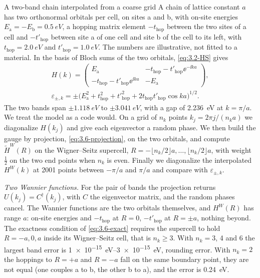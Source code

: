 \begin{workedexample}{A two-band chain interpolated from a coarse grid}\label{we:3-w1d}
A chain of lattice constant $a$ has two orthonormal orbitals per cell, on sites a and b, with on-site energies $E_{\mathrm{a}} = -E_{\mathrm{b}} = \SI{0.5}{eV}$, a hopping matrix element $-t_{\mathrm{hop}}$ between the two sites of a cell and $-t'_{\mathrm{hop}}$ between site a of one cell and site b of the cell to its left, with $t_{\mathrm{hop}} = \SI{2.0}{eV}$ and $t'_{\mathrm{hop}} = \SI{1.0}{eV}$. The numbers are illustrative, not fitted to a material. In the basis of Bloch sums of the two orbitals, \cref{eq:3.2-HS} gives
\begin{gather*}
  H(k) = \begin{pmatrix} E_{\mathrm{a}} & -t_{\mathrm{hop}} - t'_{\mathrm{hop}}\ee^{-\ii ka} \\ -t_{\mathrm{hop}} - t'_{\mathrm{hop}}\ee^{\ii ka} & -E_{\mathrm{a}} \end{pmatrix}, \\
  \varepsilon_{\pm,k} = \pm\bigl(E_{\mathrm{a}}^2 + t_{\mathrm{hop}}^2 + t'^2_{\mathrm{hop}} + 2t_{\mathrm{hop}}t'_{\mathrm{hop}}\cos ka\bigr)^{1/2} .
\end{gather*}
The two bands span $\pm\SI{1.118}{eV}$ to $\pm\SI{3.041}{eV}$, with a gap of \SI{2.236}{eV} at $k = \pi/a$. We treat the model as a code would. On a grid of $n_k$ points $k_j = 2\pi j/(n_ka)$ we diagonalize $H(k_j)$ and give each eigenvector a random phase. We then build the gauge by projection, \cref{eq:3.6-projection}, on the two orbitals, and compute $\tilde H^W(R)$ on the Wigner--Seitz supercell, $R = -\lfloor n_k/2\rfloor a, \dots, \lfloor n_k/2\rfloor a$, with weight $\frac12$ on the two end points when $n_k$ is even. Finally we diagonalize the interpolated $H^W(k)$ at 2001 points between $-\pi/a$ and $\pi/a$ and compare with $\varepsilon_{\pm,k}$.

\emph{Two Wannier functions.} For the pair of bands the projection returns $U(k_j) = C^\dagger(k_j)$, with $C$ the eigenvector matrix, and the random phases cancel. The Wannier functions are the two orbitals themselves, and $H^W(R)$ has range $a$: on-site energies and $-t_{\mathrm{hop}}$ at $R = 0$, $-t'_{\mathrm{hop}}$ at $R = \pm a$, nothing beyond. The exactness condition of \cref{eq:3.6-exact} requires the supercell to hold $R = -a, 0, a$ inside its Wigner--Seitz cell, that is $n_k \ge 3$. With $n_k = 3$, 4 and 6 the largest band error is \SIrange{1e-15}{3e-15}{eV}, rounding error. With $n_k = 2$ the hoppings to $R = +a$ and $R = -a$ fall on the same boundary point, they are not equal (one couples a to b, the other b to a), and the error is \SI{0.24}{eV}.


\end{workedexample}
